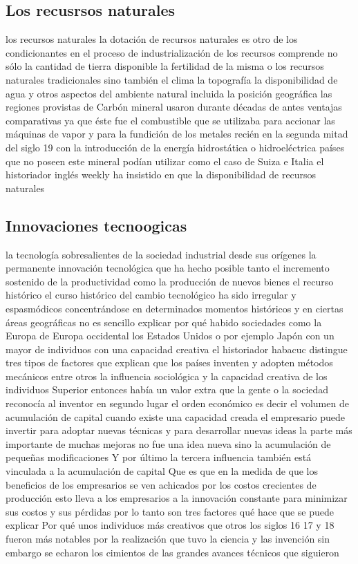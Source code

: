 \documentclass[12pt]{book}
\begin{document}
\subsection{Los recusrsos naturales}
los recursos naturales la dotación de recursos naturales es otro de los condicionantes en el proceso de industrialización de los recursos comprende no sólo la cantidad de tierra disponible la fertilidad de la misma o los recursos naturales tradicionales sino también el clima la topografía la disponibilidad de agua y otros aspectos del ambiente natural incluida la posición geográfica las regiones provistas de Carbón mineral usaron durante décadas de antes ventajas comparativas ya que éste fue el combustible que se utilizaba para accionar las máquinas de vapor y para la fundición de los metales recién en la segunda mitad del siglo 19 con la introducción de la energía hidrostática o hidroeléctrica países que no poseen este mineral podían utilizar como el caso de Suiza e Italia el historiador inglés weekly ha insistido en que la disponibilidad de recursos naturales
\subsection{Innovaciones tecnoogicas}
la tecnología sobresalientes de la sociedad industrial desde sus orígenes la permanente innovación tecnológica que ha hecho posible tanto el incremento sostenido de la productividad como la producción de nuevos bienes el recurso histórico el curso histórico del cambio tecnológico ha sido irregular y espasmódicos concentrándose en determinados momentos históricos y en ciertas áreas geográficas no es sencillo explicar por qué habido sociedades como la Europa de Europa occidental los Estados Unidos o por ejemplo Japón con un mayor de individuos con una capacidad creativa el historiador habacuc distingue tres tipos de factores que explican que los países inventen y adopten métodos mecánicos entre otros la influencia sociológica y la capacidad creativa de los individuos Superior entonces había un valor extra que la gente o la sociedad reconocía al inventor en segundo lugar el orden económico es decir el volumen de acumulación de capital cuando existe una capacidad creada el empresario puede invertir para adoptar nuevas técnicas y para desarrollar nuevas ideas la parte más importante de muchas mejoras no fue una idea nueva sino la acumulación de pequeñas modificaciones Y por último la tercera influencia también está vinculada a la acumulación de capital Que es que en la medida de que los beneficios de los empresarios se ven achicados por los costos crecientes de producción esto lleva a los empresarios a la innovación constante para minimizar sus costos y sus pérdidas por lo tanto son tres factores qué hace que se puede explicar Por qué unos individuos más creativos que otros los siglos 16 17 y 18 fueron más notables por la realización que tuvo la ciencia y las invención sin embargo se echaron los cimientos de las grandes avances técnicos que siguieron
\end{document}
